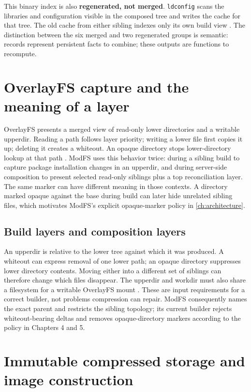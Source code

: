 This binary index is also \textbf{regenerated, not merged}. \texttt{ldconfig} scans the libraries and configuration visible in the composed tree and writes the cache for that tree. The old cache from either sibling indexes only its own build view \autocite{man-ldconfig}. The distinction between the six merged and two regenerated groups is semantic: records represent persistent facts to combine; these outputs are functions to recompute.

\section{OverlayFS capture and the meaning of a layer}

OverlayFS presents a merged view of read-only lower directories and a writable upperdir. Reading a path follows layer priority; writing a lower file first copies it up; deleting it creates a whiteout. An opaque directory stops lower-directory lookup at that path \autocite{overlayfs-kernel}. ModFS uses this behavior twice: during a sibling build to capture package installation changes in an upperdir, and during server-side composition to present selected read-only siblings plus a top reconciliation layer. The same marker can have different meaning in those contexts. A directory marked opaque against the base during build can later hide unrelated sibling files, which motivates ModFS's explicit opaque-marker policy in \cref{ch:architecture}.

\subsection{Build layers and composition layers}

An upperdir is relative to the lower tree against which it was produced. A whiteout can express removal of one lower path; an opaque directory suppresses lower directory contents. Moving either into a different set of siblings can therefore change which files disappear. The upperdir and workdir must also share a filesystem for a writable OverlayFS mount \autocite{overlayfs-kernel}. These are input requirements for a correct builder, not problems compression can repair. ModFS consequently names the exact parent and restricts the sibling topology; its current builder rejects whiteout-bearing deltas and removes opaque-directory markers according to the policy in Chapters \num{4} and 5.

\section{Immutable compressed storage and image construction}

